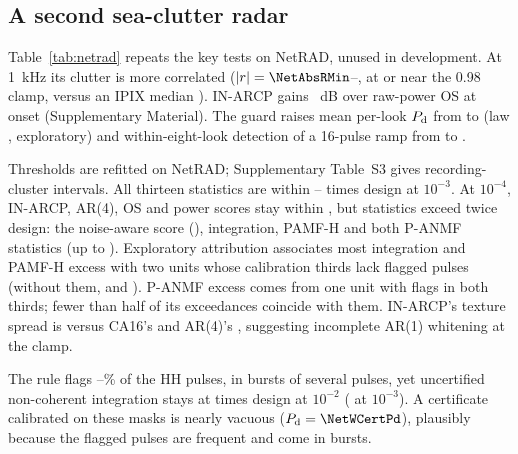 \documentclass[journal]{IEEEtran}
\begin{document}
\subsection{A second sea-clutter radar}\label{sec:netrad}
\begin{table}[!t]
\centering\footnotesize
\caption{IPIX and NetRAD S-band sea clutter, same code and settings except the ANMF secondary cells (Section~\ref{sec:design}). Entries: $P_{\rm fa}/\alpha$ at $\alpha=0.01$ unless stated; guard row: per-look $P_{\rm d}$ at 10~dB, mean over looks 1--8; $P_{\rm d}$ in parentheses at 10~dB. Conformal rows: the 12 statistics other than the clipped integrator (conservative on IPIX). Injected interference 30~dB above the local power. Flagged pulses: NetRAD HH, certificate calibrated on their masks.}
\label{tab:netrad}
\setlength{\tabcolsep}{3pt}

\end{table}
Table~\ref{tab:netrad} repeats the key tests on NetRAD, unused in development. At 1~kHz its clutter is more correlated ($|r|=\NetAbsRMin$--\NetAbsRMax, at or near the 0.98 clamp, versus an IPIX median \IpixAbsRMed). IN-ARCP gains \NetOSGain~dB over raw-power OS at onset (Supplementary Material). The guard raises mean per-look $P_{\rm d}$ from \NetGuardZero{} to \NetGuardEight{} (law \NetLawEight, exploratory) and within-eight-look detection of a 16-pulse ramp from \NetRampZero{} to \NetRampEight.

Thresholds are refitted on NetRAD; Supplementary Table~S3 gives recording-cluster intervals. All thirteen statistics are within \NetConfMinThree--\NetConfMaxThree{} times design at $10^{-3}$. At $10^{-4}$, IN-ARCP, AR(4), OS and power scores stay within \NetPerLookMax{}, but \NetNOverTwoFourWord{} statistics exceed twice design: the noise-aware score (\NetNaFour), integration, PAMF-H and both P-ANMF statistics (up to \NetDwellMax). Exploratory attribution associates most integration and PAMF-H excess with two units whose calibration thirds lack flagged pulses (without them, \NetAttrDin{} and \NetAttrPamf). P-ANMF excess comes from one unit with flags in both thirds; fewer than half of its exceedances coincide with them. IN-ARCP's texture spread is \NetSpreadIn{} versus CA16's \NetSpreadCa{} and AR(4)'s \NetSpreadInFour{}, suggesting incomplete AR(1) whitening at the clamp.

The rule flags \NetHitHHMin--\NetHitHHMax\% of the HH pulses, in bursts of several pulses, yet uncertified non-coherent integration stays at \NetWDin{} times design at $10^{-2}$ (\NetWDinThree{} at $10^{-3}$). A certificate calibrated on these masks is nearly vacuous ($P_{\rm d}=\NetWCertPd$), plausibly because the flagged pulses are frequent and come in bursts.
\end{document}
